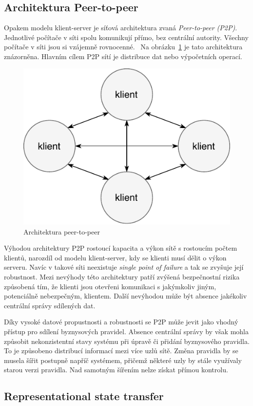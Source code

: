 \subsection{Architektura Peer-to-peer}\label{sec:p2p}

Opakem modelu klient-server je síťová architektura zvaná \textit{Peer-to-peer (\gls{P2P})}.
Jednotlivé počítače v síti spolu komunikují přímo, bez centrální autority.
Všechny počítače v síti jsou si vzájemně rovnocenné.~\cite{fox2001peer}
Na obrázku~\ref{fig:peer-to-peer} je tato architektura znázorněna.
Hlavním cílem \gls{P2P} sítí je distribuce dat nebo výpočetních operací.

\begin{figure}[t]
    \centering
    \includegraphics[keepaspectratio=true, width=0.4\linewidth]{figures/peer-to-peer.pdf}
    \caption{Architektura peer-to-peer}
    \label{fig:peer-to-peer}
\end{figure}

Výhodou architektury \gls{P2P} rostoucí kapacita a výkon sítě s rostoucím počtem klientů,
narozdíl od modelu klient-server, kdy se klienti musí dělit o výkon serveru.
Navíc v takové síti neexistuje \textit{single point of failure} a tak se zvyšuje její robustnost.
Mezi nevýhody této architektury patří zvýšená bezpečnostní rizika způsobená tím,
že klienti jsou otevřeni komunikaci s jakýmkoliv jiným, potenciálně nebezpečným, klientem.
Další nevýhodou může být absence jakékoliv centrální správy sdílených dat.

Díky vysoké datové propustnosti a robustnosti se \gls{P2P} může jevit jako vhodný přístup pro
sdílení byznysových pravidel. Absence centrální správy by však mohla způsobit nekonzistentní stavy
systému při úpravě či přidání byznysového pravidla. To je způsobeno distribucí informací mezi více uzlů sítě.
Změna pravidla by se musela šířit postupně napříč systémem, přičemž některé uzly by stále využívaly starou
verzi pravidla. Nad samotným šířením nelze získat přímou kontrolu.

\subsection{Representational state transfer}\label{sec:rest}

